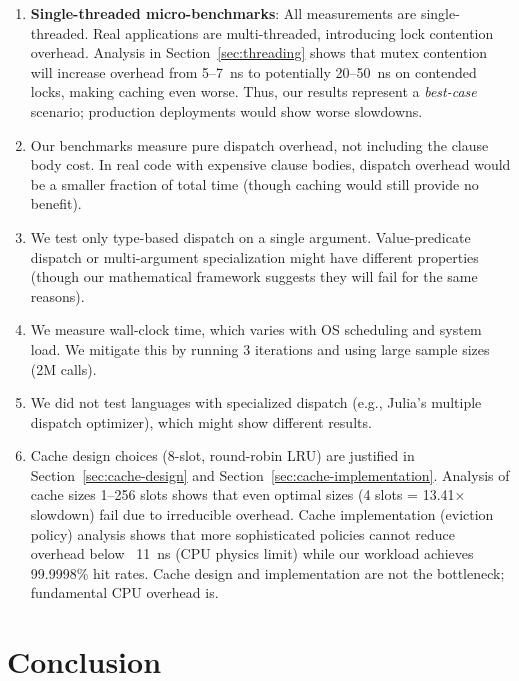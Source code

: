 \documentclass[sigplan,final]{acmart}
\begin{document}
\begin{enumerate}
  \item \textbf{Single-threaded micro-benchmarks}: All measurements are single-threaded. Real
    applications are multi-threaded, introducing lock contention overhead. Analysis in
    Section~\ref{sec:threading} shows that mutex contention will increase overhead from 5--7~ns
    to potentially 20--50~ns on contended locks, making caching even worse. Thus, our results
    represent a \emph{best-case} scenario; production deployments would show worse slowdowns.

  \item Our benchmarks measure pure dispatch overhead, not including the clause body cost. In real
    code with expensive clause bodies, dispatch overhead would be a smaller fraction of total time
    (though caching would still provide no benefit).

  \item We test only type-based dispatch on a single argument. Value-predicate dispatch or
    multi-argument specialization might have different properties (though our mathematical framework
    suggests they will fail for the same reasons).

  \item We measure wall-clock time, which varies with OS scheduling and system load. We mitigate
    this by running 3 iterations and using large sample sizes (2M calls).

  \item We did not test languages with specialized dispatch (e.g., Julia's multiple dispatch
    optimizer), which might show different results.

  \item Cache design choices (8-slot, round-robin LRU) are justified in Section~\ref{sec:cache-design}
    and Section~\ref{sec:cache-implementation}. Analysis of cache sizes 1--256 slots shows that
    even optimal sizes (4 slots = 13.41× slowdown) fail due to irreducible overhead. Cache
    implementation (eviction policy) analysis shows that more sophisticated policies cannot reduce
    overhead below ~11~ns (CPU physics limit) while our workload achieves 99.9998\% hit rates.
    Cache design and implementation are not the bottleneck; fundamental CPU overhead is.
\end{enumerate}

\section{Conclusion}
\end{document}
